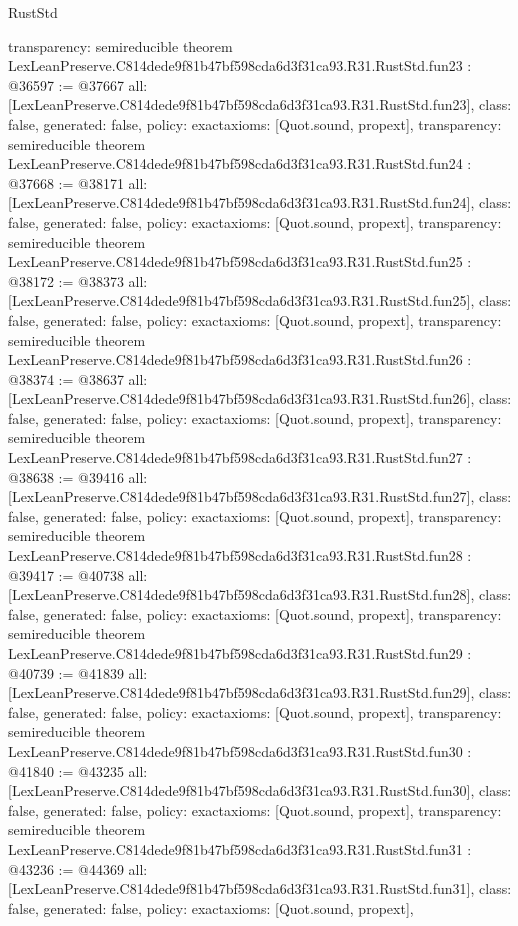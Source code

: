 \begin{lexlean}{RustStd}
\begin{coremodule}
{  transparency: semireducible
}
theorem LexLeanPreserve.C814dede9f81b47bf598cda6d3f31ca93.R31.RustStd.fun23 : @36597 := @37667 {
  all: [LexLeanPreserve.C814dede9f81b47bf598cda6d3f31ca93.R31.RustStd.fun23],
  class: false,
  generated: false,
  policy: exact{axioms: [Quot.sound, propext]},
  transparency: semireducible
}
theorem LexLeanPreserve.C814dede9f81b47bf598cda6d3f31ca93.R31.RustStd.fun24 : @37668 := @38171 {
  all: [LexLeanPreserve.C814dede9f81b47bf598cda6d3f31ca93.R31.RustStd.fun24],
  class: false,
  generated: false,
  policy: exact{axioms: [Quot.sound, propext]},
  transparency: semireducible
}
theorem LexLeanPreserve.C814dede9f81b47bf598cda6d3f31ca93.R31.RustStd.fun25 : @38172 := @38373 {
  all: [LexLeanPreserve.C814dede9f81b47bf598cda6d3f31ca93.R31.RustStd.fun25],
  class: false,
  generated: false,
  policy: exact{axioms: [Quot.sound, propext]},
  transparency: semireducible
}
theorem LexLeanPreserve.C814dede9f81b47bf598cda6d3f31ca93.R31.RustStd.fun26 : @38374 := @38637 {
  all: [LexLeanPreserve.C814dede9f81b47bf598cda6d3f31ca93.R31.RustStd.fun26],
  class: false,
  generated: false,
  policy: exact{axioms: [Quot.sound, propext]},
  transparency: semireducible
}
theorem LexLeanPreserve.C814dede9f81b47bf598cda6d3f31ca93.R31.RustStd.fun27 : @38638 := @39416 {
  all: [LexLeanPreserve.C814dede9f81b47bf598cda6d3f31ca93.R31.RustStd.fun27],
  class: false,
  generated: false,
  policy: exact{axioms: [Quot.sound, propext]},
  transparency: semireducible
}
theorem LexLeanPreserve.C814dede9f81b47bf598cda6d3f31ca93.R31.RustStd.fun28 : @39417 := @40738 {
  all: [LexLeanPreserve.C814dede9f81b47bf598cda6d3f31ca93.R31.RustStd.fun28],
  class: false,
  generated: false,
  policy: exact{axioms: [Quot.sound, propext]},
  transparency: semireducible
}
theorem LexLeanPreserve.C814dede9f81b47bf598cda6d3f31ca93.R31.RustStd.fun29 : @40739 := @41839 {
  all: [LexLeanPreserve.C814dede9f81b47bf598cda6d3f31ca93.R31.RustStd.fun29],
  class: false,
  generated: false,
  policy: exact{axioms: [Quot.sound, propext]},
  transparency: semireducible
}
theorem LexLeanPreserve.C814dede9f81b47bf598cda6d3f31ca93.R31.RustStd.fun30 : @41840 := @43235 {
  all: [LexLeanPreserve.C814dede9f81b47bf598cda6d3f31ca93.R31.RustStd.fun30],
  class: false,
  generated: false,
  policy: exact{axioms: [Quot.sound, propext]},
  transparency: semireducible
}
theorem LexLeanPreserve.C814dede9f81b47bf598cda6d3f31ca93.R31.RustStd.fun31 : @43236 := @44369 {
  all: [LexLeanPreserve.C814dede9f81b47bf598cda6d3f31ca93.R31.RustStd.fun31],
  class: false,
  generated: false,
  policy: exact{axioms: [Quot.sound, propext]},
}
\end{coremodule}
\end{lexlean}
